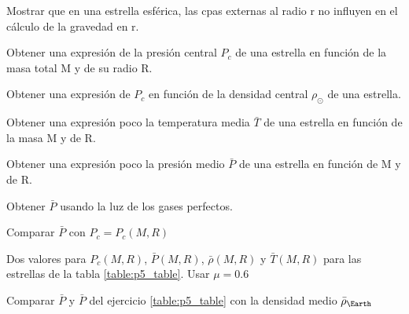 \documentclass[12pt,a4paper]{practice}
\begin{document}
    \begin{problem}\label{prob:3}
    Mostrar que en una estrella esférica, las cpas externas al radio r no influyen en el cálculo de la gravedad en r.
    \end{problem}

    \begin{problem}\label{prob:4}
        \begin{ppart}\label{prob:4:a}
        Obtener una expresión de la presión central $P_{c}$ de una estrella en función de la masa total M y de su radio R.
        \end{ppart}

        \begin{ppart}\label{prob:4:b}
        Obtener una expresión de $P_{c}$ en función de la densidad central $\rho_{\odot}$ de una estrella.
        \end{ppart}

        \begin{ppart}\label{prob:4:c}
        Obtener una expresión poco la temperatura media $\bar{T}$ de una estrella en función de la masa M y de R.
        \end{ppart}

        \begin{ppart}\label{prob:4:d}
        Obtener  una expresión poco la presión medio $\bar{P}$ de una estrella en función de M y de R.
        \end{ppart}

        \begin{ppart}\label{prob:4:e}
        Obtener $\bar{P}$  usando la luz de los gases perfectos.
        \end{ppart}

        \begin{ppart}\label{prob:4:f}
        Comparar $\bar{P}$ con $P_{c} = P_{c} (M,R)$
        \end{ppart}
    \end{problem}

    \begin{problem}\label{prob:5}
    Dos valores para $P_{c}(M,R)$, $\bar{P}(M,R)$, $\bar{\rho}(M,R)$ y $\bar{T}(M,R)$ para las estrellas de la tabla \ref{table:p5_table}. Usar $\mu = 0.6$
    \end{problem}

    \begin{problem}\label{prob:6}
    Comparar $\bar{P}$ y $\bar{P}$ del ejercicio \ref{table:p5_table} con la densidad medio $\bar{\rho}_{\Earth}$
    \end{problem}
\end{document}
